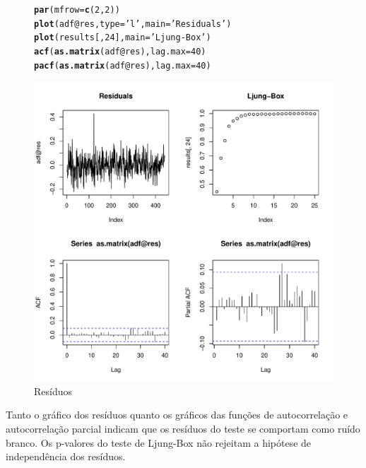\documentclass{article}\usepackage[]{graphicx}\usepackage[]{color}
\makeatletter
\def\maxwidth{ %
  \ifdim\Gin@nat@width>\linewidth
    \linewidth
  \else
    \Gin@nat@width
  \fi
}
\newcommand{\hlnum}[1]{\textcolor[rgb]{0.686,0.059,0.569}{#1}}%
\newcommand{\hlstr}[1]{\textcolor[rgb]{0.192,0.494,0.8}{#1}}%
\newcommand{\hlopt}[1]{\textcolor[rgb]{0,0,0}{#1}}%
\newcommand{\hlstd}[1]{\textcolor[rgb]{0.345,0.345,0.345}{#1}}%
\newcommand{\hlkwc}[1]{\textcolor[rgb]{0.333,0.667,0.333}{#1}}%
\newcommand{\hlkwd}[1]{\textcolor[rgb]{0.737,0.353,0.396}{\textbf{#1}}}%
\newenvironment{kframe}{%
 \def\at@end@of@kframe{}%
 \ifinner\ifhmode%
  \def\at@end@of@kframe{\end{minipage}}%
  \begin{minipage}{\columnwidth}%
 \fi\fi%
 \def\FrameCommand##1{\hskip\@totalleftmargin \hskip-\fboxsep
 \colorbox{shadecolor}{##1}\hskip-\fboxsep
     \hskip-\linewidth \hskip-\@totalleftmargin \hskip\columnwidth}%
 \MakeFramed {\advance\hsize-\width
   \@totalleftmargin\z@ \linewidth\hsize
   \@setminipage}}%
 {\par\unskip\endMakeFramed%
 \at@end@of@kframe}
\newenvironment{knitrout}{}{} %
\makeatother
\begin{document}
            \begin{figure}[H]
            \caption{Resíduos}
            \centering
\begin{knitrout}
\color{fgcolor}\begin{kframe}
\begin{alltt}
\hlkwd{par}\hlstd{(}\hlkwc{mfrow} \hlstd{=} \hlkwd{c}\hlstd{(}\hlnum{2}\hlstd{,}\hlnum{2}\hlstd{))}
\hlkwd{plot}\hlstd{(adf}\hlopt{@}\hlkwc{res}\hlstd{,} \hlkwc{type}\hlstd{=}\hlstr{'l'}\hlstd{,} \hlkwc{main}\hlstd{=}\hlstr{'Residuals'}\hlstd{)}
\hlkwd{plot}\hlstd{(results[,}\hlnum{24}\hlstd{],} \hlkwc{main}\hlstd{=}\hlstr{'Ljung-Box'}\hlstd{)}
\hlkwd{acf}\hlstd{(}\hlkwd{as.matrix}\hlstd{(adf}\hlopt{@}\hlkwc{res}\hlstd{),} \hlkwc{lag.max}\hlstd{=}\hlnum{40}\hlstd{)}
\hlkwd{pacf}\hlstd{(}\hlkwd{as.matrix}\hlstd{(adf}\hlopt{@}\hlkwc{res}\hlstd{),} \hlkwc{lag.max}\hlstd{=}\hlnum{40}\hlstd{)}
\end{alltt}
\end{kframe}
\includegraphics[width=\maxwidth]{figure/unnamed-chunk-37-1} 

\end{knitrout}
            \end{figure}

            Tanto o gráfico dos resíduos quanto os gráficos das funções de autocorrelação e autocorrelação parcial indicam que os resíduos do teste se comportam como ruído branco. Os p-valores do teste de Ljung-Box não rejeitam a hipótese de independência dos resíduos.
\end{document}
